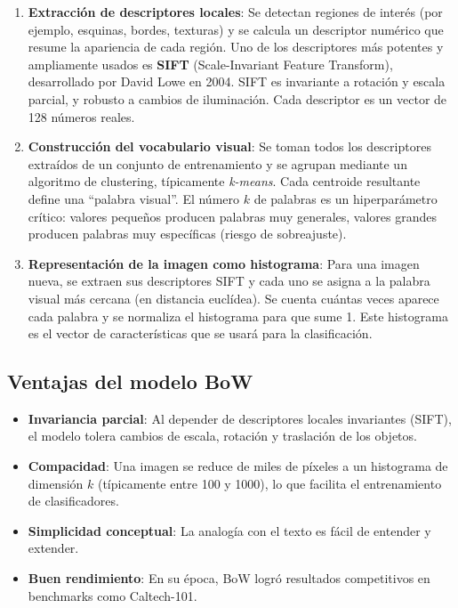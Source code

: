 \documentclass{article}
\begin{document}
\begin{enumerate}
    \item \textbf{Extracción de descriptores locales}: Se detectan regiones de interés (por ejemplo, esquinas, bordes, texturas) y se calcula un descriptor numérico que resume la apariencia de cada región. Uno de los descriptores más potentes y ampliamente usados es \textbf{SIFT} (Scale-Invariant Feature Transform), desarrollado por David Lowe en 2004. SIFT es invariante a rotación y escala parcial, y robusto a cambios de iluminación. Cada descriptor es un vector de 128 números reales.
    
    \item \textbf{Construcción del vocabulario visual}: Se toman todos los descriptores extraídos de un conjunto de entrenamiento y se agrupan mediante un algoritmo de clustering, típicamente \textit{k-means}. Cada centroide resultante define una “palabra visual”. El número $k$ de palabras es un hiperparámetro crítico: valores pequeños producen palabras muy generales, valores grandes producen palabras muy específicas (riesgo de sobreajuste).
    
    \item \textbf{Representación de la imagen como histograma}: Para una imagen nueva, se extraen sus descriptores SIFT y cada uno se asigna a la palabra visual más cercana (en distancia euclídea). Se cuenta cuántas veces aparece cada palabra y se normaliza el histograma para que sume 1. Este histograma es el vector de características que se usará para la clasificación.
\end{enumerate}

\subsection{Ventajas del modelo BoW}
\begin{itemize}
    \item \textbf{Invariancia parcial}: Al depender de descriptores locales invariantes (SIFT), el modelo tolera cambios de escala, rotación y traslación de los objetos.
    \item \textbf{Compacidad}: Una imagen se reduce de miles de píxeles a un histograma de dimensión $k$ (típicamente entre 100 y 1000), lo que facilita el entrenamiento de clasificadores.
    \item \textbf{Simplicidad conceptual}: La analogía con el texto es fácil de entender y extender.
    \item \textbf{Buen rendimiento}: En su época, BoW logró resultados competitivos en benchmarks como Caltech-101.
\end{itemize}
\end{document}
